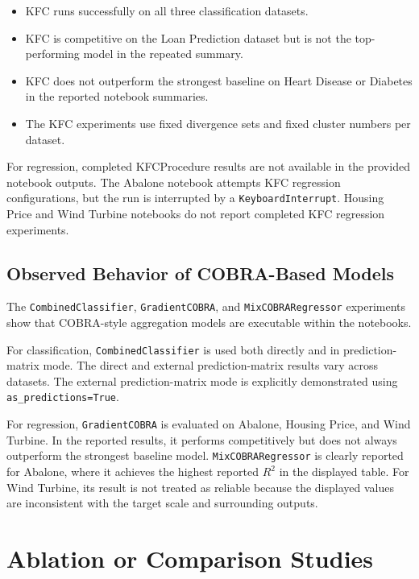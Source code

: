 \begin{itemize}
    \item KFC runs successfully on all three classification datasets.
    \item KFC is competitive on the Loan Prediction dataset but is not the top-performing model in the repeated summary.
    \item KFC does not outperform the strongest baseline on Heart Disease or Diabetes in the reported notebook summaries.
    \item The KFC experiments use fixed divergence sets and fixed cluster numbers per dataset.
\end{itemize}

For regression, completed KFCProcedure results are not available in the provided notebook outputs. The Abalone notebook attempts KFC regression configurations, but the run is interrupted by a \texttt{KeyboardInterrupt}. Housing Price and Wind Turbine notebooks do not report completed KFC regression experiments.

\subsection{Observed Behavior of COBRA-Based Models}

The \texttt{CombinedClassifier}, \texttt{GradientCOBRA}, and \texttt{MixCOBRARegressor} experiments show that COBRA-style aggregation models are executable within the notebooks.

For classification, \texttt{CombinedClassifier} is used both directly and in prediction-matrix mode. The direct and external prediction-matrix results vary across datasets. The external prediction-matrix mode is explicitly demonstrated using \texttt{as\_predictions=True}.

For regression, \texttt{GradientCOBRA} is evaluated on Abalone, Housing Price, and Wind Turbine. In the reported results, it performs competitively but does not always outperform the strongest baseline model. \texttt{MixCOBRARegressor} is clearly reported for Abalone, where it achieves the highest reported $R^2$ in the displayed table. For Wind Turbine, its result is not treated as reliable because the displayed values are inconsistent with the target scale and surrounding outputs.

\section{Ablation or Comparison Studies}
\label{sec:ablation_comparison_studies}

